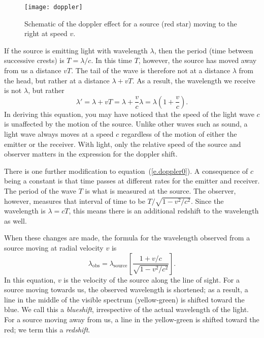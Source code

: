 \begin{figure*}
\texttt{[image: doppler]}
\caption[Schematic of the doppler effect]{Schematic of the doppler effect for a source (red star) moving to the right at speed $v$.}
\label{f.doppler}
\end{figure*}

If the source is emitting light with wavelength $\lambda$, then the period (time between successive crests) is $T = \lambda/c$.  In this time $T$, however, the source has moved away from us a distance $vT$. The tail of the wave is therefore not at a distance $\lambda$ from the head, but rather at a distance $\lambda + vT$.  As a result, the wavelength we receive is not $\lambda$, but rather
\begin{equation}\label{e.doppler0}
 \lambda' = \lambda + vT = \lambda + \frac{v}{c}\lambda = \lambda\left(1+\frac{v}{c}\right).
\end{equation}
In deriving this equation, you may have noticed that the speed of the light wave $c$ is unaffected by the motion of the source.  Unlike other waves such as sound, a light wave always moves at a speed $c$ regardless of the motion of either the emitter or the receiver. With light, only the relative speed of the source and observer matters in the expression for the doppler shift.

There is one further modification to equation~(\ref{e.doppler0}).
A consequence of $c$ being a constant is that time passes at different rates for the emitter and receiver.  The period of the wave $T$ is what is measured at the source.  The observer, however, measures that interval of time to be $T/\sqrt{1-v^{2}/c^{2}}$.  Since the wavelength is $\lambda = cT$, this means there is an additional redshift to the wavelength as well.

When these changes are made, the formula for the wavelength observed from a source moving at radial velocity $v$ is
\begin{equation}\label{e.doppler}
\lambda_{\mathrm{obs}} 
 = \lambda_{\mathrm{source}} \left[\frac{1+v/c}{\sqrt{1-v^{2}/c^{2}}}\right].
\end{equation}
In this equation, $v$ is the velocity of the source along the line of sight.
For a source moving towards us, the observed wavelength is shortened; as a result, a line in the middle of the visible spectrum (yellow-green) is shifted toward the blue.  We call this a \emph{blueshift}, irrespective of the actual wavelength of the light.  For a source moving away from us, a line in the yellow-green is shifted toward the red; we term this a \emph{redshift}.

